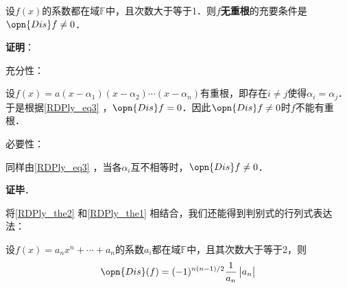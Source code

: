 \begin{theorem}{}\label{RDPly_the1}
设$f(x)$的系数都在域$\mathbb{F}$中，且次数大于等于1．则$f$\textbf{无重根}的充要条件是$\opn{Dis}f\neq 0$．
\end{theorem}

\textbf{证明}：

充分性：

设$f(x)=a(x-\alpha_1)(x-\alpha_2)\cdots(x-\alpha_n)$有重根，即存在$i\neq j$使得$\alpha_i=\alpha_j$．于是根据\autoref{RDPly_eq3} ，$\opn{Dis}f = 0$．因此$\opn{Dis}f\neq 0$时$f$不能有重根．

必要性：

同样由\autoref{RDPly_eq3} ，当各$\alpha_i$互不相等时，$\opn{Dis}f\neq 0$．

\textbf{证毕}．


将\autoref{RDPly_the2} 和\autoref{RDPly_the1} 相结合，我们还能得到判别式的行列式表达法：

\begin{theorem}{}
设$f(x)=a_nx^n+\cdots+a_n$的系数$a_i$都在域$\mathbb{F}$中，且其次数大于等于2，则
\begin{equation}
\opn{Dis}(f) = (-1)^{n(n-1)/2}\frac{1}{a_n}
\begin{vmatrix}
a_n
\end{vmatrix}
\end{equation}
\end{theorem}











